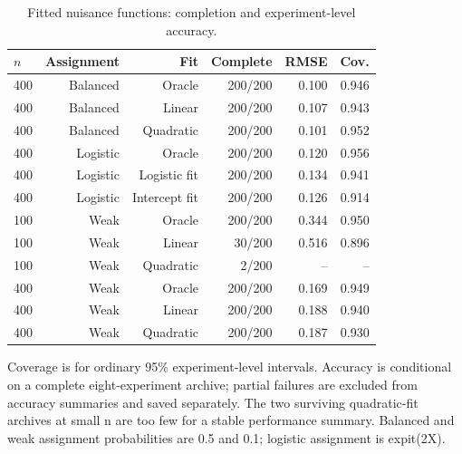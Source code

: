 \begin{table}[htbp]
\centering\small
\setlength{\tabcolsep}{4pt}
\caption{Fitted nuisance functions: completion and experiment-level accuracy.}
\label{tab:b-nuisance}
\begin{tabular}{lrrrrr}
\toprule
$n$ & Assignment & Fit & Complete & RMSE & Cov. \\
\midrule
400 & Balanced & Oracle & 200/200 & 0.100 & 0.946 \\
400 & Balanced & Linear & 200/200 & 0.107 & 0.943 \\
400 & Balanced & Quadratic & 200/200 & 0.101 & 0.952 \\
400 & Logistic & Oracle & 200/200 & 0.120 & 0.956 \\
400 & Logistic & Logistic fit & 200/200 & 0.134 & 0.941 \\
400 & Logistic & Intercept fit & 200/200 & 0.126 & 0.914 \\
100 & Weak & Oracle & 200/200 & 0.344 & 0.950 \\
100 & Weak & Linear & 30/200 & 0.516 & 0.896 \\
100 & Weak & Quadratic & 2/200 & -- & -- \\
400 & Weak & Oracle & 200/200 & 0.169 & 0.949 \\
400 & Weak & Linear & 200/200 & 0.188 & 0.940 \\
400 & Weak & Quadratic & 200/200 & 0.187 & 0.930 \\
\bottomrule
\end{tabular}
\par\smallskip\begin{minipage}{0.97\linewidth}\footnotesize Coverage is for ordinary 95\% experiment-level intervals. Accuracy is conditional on a complete eight-experiment archive; partial failures are excluded from accuracy summaries and saved separately. The two surviving quadratic-fit archives at small n are too few for a stable performance summary. Balanced and weak assignment probabilities are 0.5 and 0.1; logistic assignment is expit(2X).\end{minipage}
\end{table}
